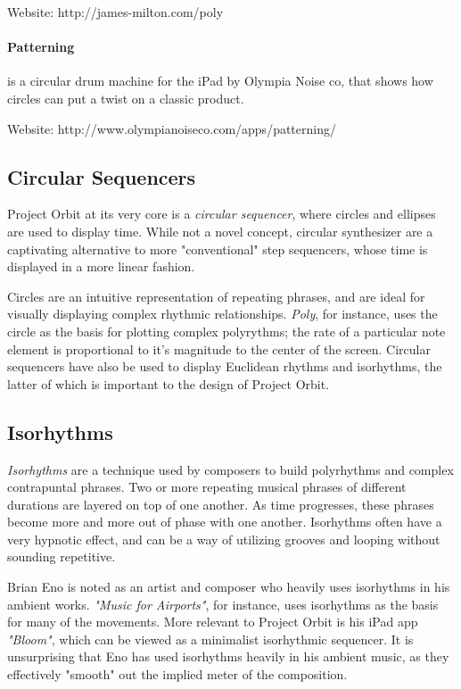 \documentclass[11pt, twocolumn]{article}
\begin{document}
Website: http://james-milton.com/poly

\paragraph{Patterning} is a circular drum machine for the iPad by Olympia Noise co, 
that shows how circles can put a twist on a classic product.

Website: http://www.olympianoiseco.com/apps/patterning/

\subsection{Circular Sequencers}

Project Orbit at its very core is a \emph{circular sequencer}, where circles and
ellipses are used to display time. While not a novel concept, circular synthesizer 
are a captivating alternative 
to more "conventional" step sequencers, whose time is displayed in a more linear fashion. 

Circles are an intuitive representation of repeating phrases, and are ideal for visually displaying complex
rhythmic relationships.
\emph{Poly}, for instance, uses the circle as the 
basis for plotting complex polyrythms; the rate of a particular note element is
proportional to it's magnitude to the center of the screen. Circular sequencers have also be used to display Euclidean 
rhythms and isorhythms, the latter
of which is important to the design of Project Orbit.


\subsection{Isorhythms}

\emph{Isorhythms} are a technique used by composers to build polyrhythms and complex contrapuntal phrases.
Two or more repeating musical phrases of different durations are 
layered on top of one another. As time progresses, these phrases become more
and more out of phase with one another. Isorhythms often have a 
very hypnotic effect, and can be a way of utilizing grooves and looping without sounding repetitive. 

Brian Eno is noted as an artist and composer who heavily uses isorhythms in his ambient works.
\emph{"Music for Airports"}, for instance, uses isorhythms as the basis for many of the movements. 
More relevant to Project Orbit is his iPad app \emph{"Bloom"}, which can be viewed as a minimalist
isorhythmic sequencer. It is unsurprising that Eno has used isorhythms heavily in
his ambient music, as they effectively "smooth" out the implied meter of the composition. 
\end{document}
